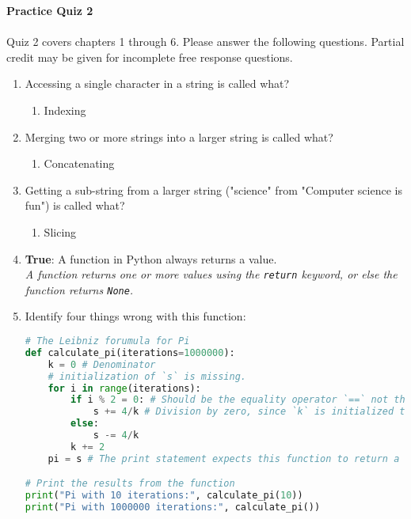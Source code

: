 \documentclass[letter,10pt]{article}
\newcommand*\tick{\item[\Checkmark]}
\begin{document}
\huge
\textbf{Practice Quiz 2}
\normalsize

\paragraph{}Quiz 2 covers chapters 1 through 6. Please answer the following questions. Partial credit may be given for incomplete free response questions.

\begin{enumerate}
    \item Accessing a single character in a string is called what?
    \begin{enumerate}
        \tick Indexing
    \end{enumerate}

    \item Merging two or more strings into a larger string is called what?
    \begin{enumerate}
        \tick Concatenating
    \end{enumerate}

    \item Getting a sub-string from a larger string ("science" from "Computer science is fun") is called what?
    \begin{enumerate}
        \tick Slicing
    \end{enumerate}

    \item \textbf{True}: A function in Python always returns a value. \\
    \textit{A function returns one or more values using the \texttt{return} keyword, or else the function returns \texttt{None}.}

    \item Identify four things wrong with this function:
    \begin{lstlisting}[language=python]
# The Leibniz forumula for Pi
def calculate_pi(iterations=1000000):
    k = 0 # Denominator
    # initialization of `s` is missing.
    for i in range(iterations):
        if i % 2 = 0: # Should be the equality operator `==` not the assignment operator `=`
            s += 4/k # Division by zero, since `k` is initialized to zero
        else:
            s -= 4/k
        k += 2
    pi = s # The print statement expects this function to return a value, but there's no `return pi` statement.

# Print the results from the function
print("Pi with 10 iterations:", calculate_pi(10))
print("Pi with 1000000 iterations:", calculate_pi())
    \end{lstlisting}


\end{enumerate}
\end{document}
